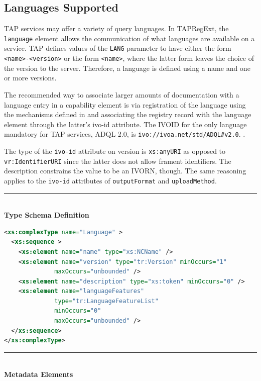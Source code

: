 \documentclass{ivoa}
\begin{document}

\subsection{Languages Supported}

\label{langs}

TAP services may offer a variety of query languages.  In TAPRegExt, the
\texttt{language} element allows the communication of what languages are
available on a service.  TAP defines values of the \texttt{LANG} parameter
to have either the form \texttt{<name>-<version>} or the form
\texttt{<name>}, where the latter form leaves the choice of the
version to the server.  Therefore, a language is defined using a name and one
or more versions.

The recommended way to associate larger amounts of documentation with a
language entry in a capability element is via registration of the language
using the mechanisms defined in \citep{std:STDREGEXT} and associating
the registry record with the language element through the latter's ivo-id
attribute.  The IVOID for the only language mandatory for TAP services,
ADQL 2.0, is 
\nolinkurl{ivo://ivoa.net/std/ADQL#v2.0}.
.

The type of the \texttt{ivo-id} attribute on version is 
\texttt{xs:anyURI} as opposed to \texttt{vr:IdentifierURI} since
the latter does not allow frament identifiers. 
The description constrains the value to be an
IVORN, though.  The same reasoning applies to the \texttt{ivo-id}
attributes of \texttt{outputFormat} and \texttt{uploadMethod}.

\noindent\rule[-2pt]{\textwidth}{0.5pt}\\
			\textbf{ Type Schema Definition}

\begin{lstlisting}[language=XML]
<xs:complexType name="Language" >
  <xs:sequence >
    <xs:element name="name" type="xs:NCName" />
    <xs:element name="version" type="tr:Version" minOccurs="1"
              maxOccurs="unbounded" />
    <xs:element name="description" type="xs:token" minOccurs="0" />
    <xs:element name="languageFeatures"
              type="tr:LanguageFeatureList"
              minOccurs="0"
              maxOccurs="unbounded" />
  </xs:sequence>
</xs:complexType>
\end{lstlisting}

\noindent\rule[-2pt]{\textwidth}{0.5pt}\\
					\textbf{ Metadata Elements}
\end{document}
